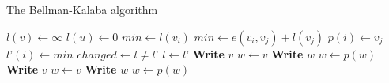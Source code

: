 \begin{breakablealgorithm}
\caption{The Bellman-Kalaba algorithm} 
\begin{algorithmic}[1]
    \State $l(v) \leftarrow \infty$
  \EndFor
  \State $l(u) \leftarrow 0$
  \Repeat
      \State $min \leftarrow l(v_i)$ 
          \State $min \leftarrow e(v_i, v_j) + l(v_j)$ 
          \State $p(i) \leftarrow v_j$
        \EndIf
      \EndFor
      \State $l’(i) \leftarrow min$
    \EndFor
    \State $changed \leftarrow l \not= l’$
    \State $l \leftarrow l’$
\EndProcedure
\Statex
{}
    \State \textbf{Write} $v$
  \Else
    \State $w \leftarrow v$ 
        \State \textbf{Write} $w$
        \State $w \leftarrow p(w)$
    \EndWhile
  \EndIf
\EndProcedure
\Statex
{}
    \State \textbf{Write} $v$
  \Else
    \State $w \leftarrow v$ 
        \State \textbf{Write} $w$
        \State $w \leftarrow p(w)$
    \EndWhile
  \EndIf
\EndProcedure
\end{algorithmic}
\end{breakablealgorithm}
